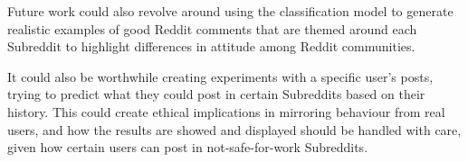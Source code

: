 Future work could also revolve around using the classification model to generate realistic examples of good Reddit comments that are themed around each Subreddit to highlight differences in attitude among Reddit communities.

It could also be worthwhile creating experiments with a specific user's posts, trying to predict what they could post in certain Subreddits based on their history. This could create ethical implications in mirroring behaviour from real users, and how the results are showed and displayed should be handled with care, given how certain users can post in not-safe-for-work Subreddits.
